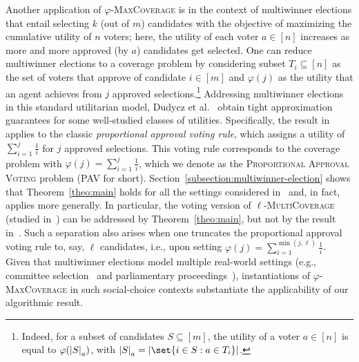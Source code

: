 Another application of $\varphi$-\textsc{MaxCoverage} is in the context of multiwinner elections that entail selecting $k$ (out of $m$) candidates with the objective of maximizing the cumulative utility of $n$ voters; here, the utility of each voter $a \in [n]$ increases as more and more approved (by $a$) candidates get selected. One can reduce multiwinner elections to a coverage problem by considering subset $T_i \subseteq [n]$ as the set of voters that approve of candidate $i \in [m]$ and $\varphi(j)$ as the utility that an agent achieves from $j$ approved selections.\footnote{Indeed, for a subset of candidates $S \subseteq [m]$, the utility of a voter $a \in [n]$ is equal to $\varphi ( \abs{S}_a)$, with $\abs{S}_a = \abs{\set{i \in S : a \in T_i}}$.} Addressing multiwinner elections in this standard utilitarian model, Dudycz et al.~\cite{DMMS20} obtain tight approximation guarantees for some well-studied classes of utilities. Specifically, the result in~\cite{DMMS20} applies to the classic \emph{proportional approval voting rule}, which assigns a utility of $\sum_{i=1}^j \frac{1}{i}$ for $j$ approved selections. This voting rule corresponds to the coverage problem with $\varphi(j) = \sum_{i=1}^j \frac{1}{i}$, which we denote as the \textsc{Proportional Approval Voting} problem (\textsc{PAV} for short). Section~\ref{subsection:multiwinner-election} shows that Theorem~\ref{theo:main} holds for all the settings considered in~\cite{DMMS20} and, in fact, applies more generally. In particular, the voting version of $\ell$-\textsc{MultiCoverage} (studied in~\cite{SFL16}) can be addressed by Theorem~\ref{theo:main}, but not by the result in~\cite{DMMS20}. Such a separation also arises when one truncates the proportional approval voting rule to, say, $\ell$ candidates, i.e., upon setting $\varphi(j) = \sum_{i=1}^{\min(j, \ell)} \frac{1}{i}$. Given that multiwinner elections model multiple real-world settings (e.g., committee selection~\cite{SFL16} and parliamentary proceedings~\cite{Brill2018}), instantiations of $\varphi$-\textsc{MaxCoverage} in such social-choice contexts substantiate the applicability of our algorithmic result.

